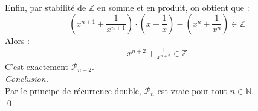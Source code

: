 \documentclass[10pt]{article}
\begin{document}
\begin{tcolorbox}[enhanced, width=6in, center, size=fbox, fontupper=\large, drop shadow southwest]
    Enfin, par stabilité de $\mathbb{Z}$ en somme et en produit, on obtient que :
    \begin{equation*}
        (x^{n+1}+\frac{1}{x^{n+1}})\cdot(x+\frac{1}{x})-(x^n+\frac{1}{x^n})\in\mathbb{Z}
    \end{equation*}
    Alors :
    \begin{align*}
        x^{n+2} + \frac{1}{x^{n+2}} \in \mathbb{Z}
    \end{align*}
    C'est exactement $\mathcal{P}_{n+2}$.\\
    \emph{Conclusion.}\\
    Par le principe de récurrence double, $\mathcal{P}_n$ est vraie pour tout $n\in\mathbb{N}$.\\
    \qed
\end{tcolorbox}
\end{document}
